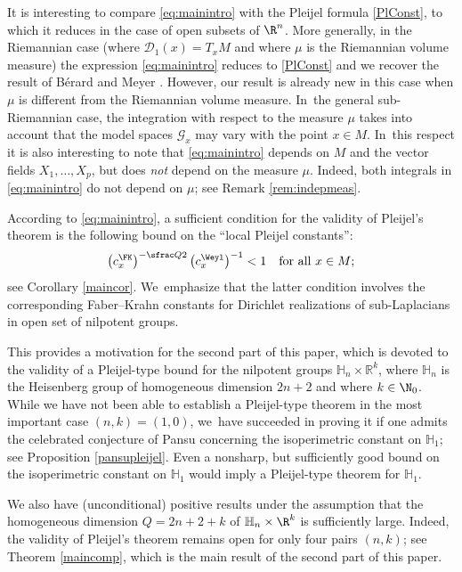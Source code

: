 It is interesting to compare \eqref{eq:mainintro} with the Pleijel formula \eqref{PlConst}, to which it reduces in the case of open subsets of $\R^n$. More generally, in the Riemannian case (where $\mathcal D_1(x) = T_x M$ and where $\mu$ is the Riemannian volume measure) the expression \eqref{eq:mainintro} reduces to \eqref{PlConst} and we recover the result of Bérard and Meyer \cite{BerMe}. However, our result is already new in this case when $\mu$ is different from the Riemannian volume measure. In~the general sub-Riemannian case, the integration with respect to the measure $\mu$ takes into account that the model spaces $\mathcal G_x$ may vary with the point $x\in M$. In~this respect it is also interesting to note that \eqref{eq:mainintro} depends on $M$ and the vector fields $X_1,\ldots,X_p$, but does \emph{not} depend on the measure $\mu$. Indeed, both integrals in \eqref{eq:mainintro} do not depend on $\mu$; see Remark \ref{rem:indepmeas}.

According to \eqref{eq:mainintro}, a sufficient condition for the validity of Pleijel's theorem is the following bound on the ``local Pleijel constants'':
\[
\bigl(c_x^\FK \bigr)^{-\sfrac Q2} \,\bigl(c_x^\Weyl \bigr)^{-1} < 1
\quad\text{for all}\ x\in M ;
\]
see Corollary \ref{maincor}. We~emphasize that the latter condition involves the corresponding Faber--Krahn constants for Dirichlet realizations of sub-Laplacians in open set of nilpotent groups.

This provides a motivation for the second part of this paper, which is devoted to the validity of a Pleijel-type bound for the nilpotent groups $\mathbb H_n \times \mathbb R^k$, where $\mathbb H_n $ is the Heisenberg group of homogeneous dimension $2n+2$ and where $k\in\N_0$. While we have not been able to establish a Pleijel-type theorem in the most important case $(n,k)=(1,0)$, we~have succeeded in proving it if one admits the celebrated conjecture of Pansu concerning the isoperimetric constant on $\mathbb H_1$; see Proposition \ref{pansupleijel}. Even a nonsharp, but sufficiently good bound on the isoperimetric constant on $\mathbb H_1$ would imply a Pleijel-type theorem for $\mathbb H_1$.

We also have (unconditional) positive results under the assumption that the homogeneous dimension $Q=2n+2+k$ of $\mathbb H_n\times\R^k$ is sufficiently large. Indeed, the validity of Pleijel's theorem remains open for only four pairs $(n,k)$; see Theorem \ref{maincomp}, which is the main result of the second part of this paper.

